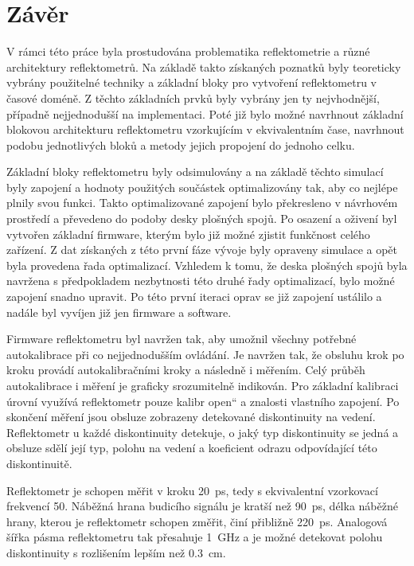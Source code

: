 \chapter{Závěr}

V rámci této práce byla prostudována problematika reflektometrie a různé architektury reflektometrů. Na základě takto získaných poznatků byly teoreticky vybrány použitelné techniky a základní bloky pro vytvoření reflektometru v časové doméně. Z těchto základních prvků byly vybrány jen ty nejvhodnější, případně nejjednodušší na implementaci. Poté již bylo možné navrhnout základní blokovou architekturu reflektometru vzorkujícím v ekvivalentním čase, navrhnout podobu jednotlivých bloků a metody jejich propojení do jednoho celku. 

Základní bloky reflektometru byly odsimulovány a na základě těchto simulací byly zapojení a hodnoty použitých součástek optimalizovány tak, aby co nejlépe plnily svou funkci. Takto optimalizované zapojení bylo překresleno v návrhovém prostředí a převedeno do podoby desky plošných spojů. Po osazení a oživení byl vytvořen základní firmware, kterým bylo již možné zjistit funkčnost celého zařízení. Z dat získaných z této první fáze vývoje byly opraveny simulace a opět byla provedena řada optimalizací. Vzhledem k tomu, že deska plošných spojů byla navržena s předpokladem nezbytnosti této druhé řady optimalizací, bylo možné zapojení snadno upravit. Po této první iteraci oprav se již zapojení ustálilo a nadále byl vyvíjen již jen firmware a software.

Firmware reflektometru byl navržen tak, aby umožnil všechny potřebné autokalibrace při co nejjednodušším ovládání. Je navržen tak, že obsluhu krok po kroku provádí autokalibračními kroky a následně i měřením. Celý průběh autokalibrace i měření je graficky srozumitelně indikován. Pro základní kalibraci úrovní využívá reflektometr pouze kalibr \quotedblbase open\textquotedblleft{} a znalosti vlastního zapojení. Po skončení měření jsou obsluze zobrazeny detekované diskontinuity na vedení. Reflektometr u každé diskontinuity detekuje, o jaký typ diskontinuity se jedná a obsluze sdělí její typ, polohu na vedení a koeficient odrazu odpovídající této diskontinuitě.

Reflektometr je schopen měřit v kroku \SI{20}{\pico\second}, tedy s ekvivalentní vzorkovací frekvencí \SI{50}{\gigasample}. Náběžná hrana budicího signálu je kratší než \SI{90}{\pico\second}, délka náběžné hrany, kterou je reflektometr schopen změřit, činí přibližně \SI{220}{\pico\second}. Analogová šířka pásma reflektometru tak přesahuje \SI{1}{\giga\hertz} a je možné detekovat polohu diskontinuity s rozlišením lepším než \SI{0.3}{\centi\meter}.


